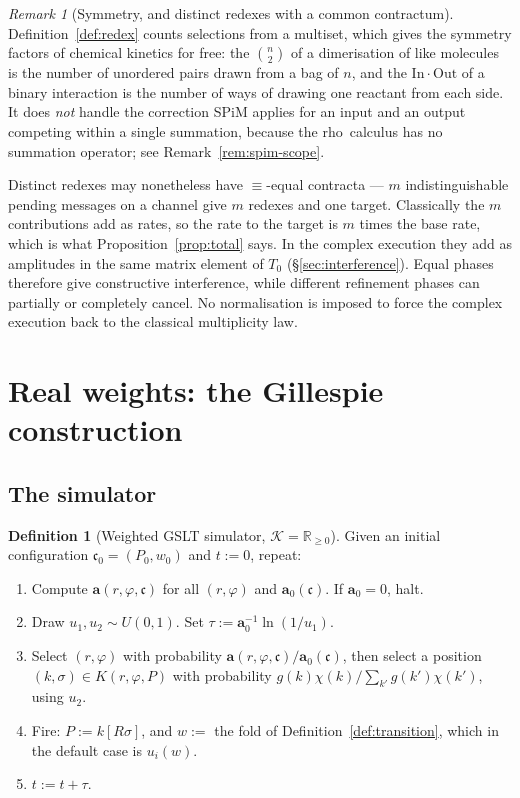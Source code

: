 \documentclass[11pt,a4paper]{article}
\theoremstyle{plain}
\theoremstyle{definition}
\newtheorem{definition}[theorem]{Definition}
\theoremstyle{remark}
\newtheorem{remark}[theorem]{Remark}
\newcommand{\rhoc}{\textsf{rho}}
\newcommand{\Rnn}{\mathbb{R}_{\geq 0}}
\newcommand{\prop}{\mathbf{a}}
\newcommand{\wmap}{w}
\newcommand{\gfac}{g}
\begin{document}
\begin{remark}[Symmetry, and distinct redexes with a common contractum]
\label{rem:distinct-contracta}
Definition~\ref{def:redex} counts selections from a multiset, which gives the symmetry factors of
chemical kinetics for free: the $\binom{n}{2}$ of a dimerisation of like molecules is the number of
unordered pairs drawn from a bag of $n$, and the $\mathrm{In}\cdot\mathrm{Out}$ of a binary
interaction is the number of ways of drawing one reactant from each side. It does \emph{not} handle
the correction SPiM applies for an input and an output competing within a single summation, because
the \rhoc\ calculus has no summation operator; see Remark~\ref{rem:spim-scope}.

Distinct redexes may nonetheless have $\equiv$-equal contracta --- $m$ indistinguishable pending
messages on a channel give $m$ redexes and one target. Classically the $m$ contributions add as rates,
so the rate to the target is $m$ times the base rate, which is what Proposition~\ref{prop:total} says.
In the complex execution they add as amplitudes in the same matrix element of $T_0$
(\S\ref{sec:interference}). Equal phases therefore give constructive interference, while different
refinement phases can partially or completely cancel. No normalisation is imposed to force the
complex execution back to the classical multiplicity law.
\end{remark}

\section{Real weights: the Gillespie construction}
\label{sec:gillespie}

\subsection{The simulator}

\begin{definition}[Weighted GSLT simulator, $\mathcal{K} = \Rnn$]
\label{def:ssa}
Given an initial configuration $\mathfrak{c}_0 = (P_0, \wmap_0)$ and $t := 0$, repeat:
\begin{enumerate}[leftmargin=2.2em]
\item Compute $\prop(r,\varphi,\mathfrak{c})$ for all $(r,\varphi)$ and $\prop_0(\mathfrak{c})$. If
$\prop_0 = 0$, halt.
\item Draw $u_1, u_2 \sim U(0,1)$. Set $\tau := \prop_0^{-1}\ln(1/u_1)$.
\item Select $(r,\varphi)$ with probability $\prop(r,\varphi,\mathfrak{c})/\prop_0(\mathfrak{c})$,
then select a position $(k,\sigma) \in K(r,\varphi,P)$ with probability
$\gfac(k)\chi(k)/\sum_{k'}\gfac(k')\chi(k')$, using $u_2$.
\item Fire: $P := k[R\sigma]$, and $\wmap := $ the fold of Definition~\ref{def:transition}, which in
the default case is $u_i(\wmap)$.
\item $t := t + \tau$.
\end{enumerate}
\end{definition}
\end{document}
